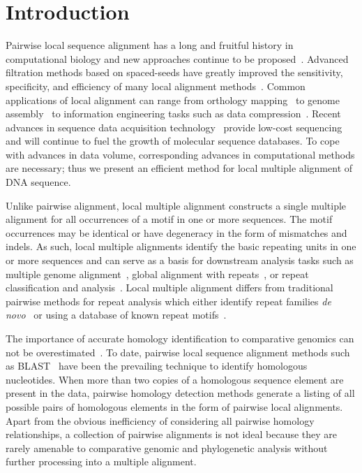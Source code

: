 \documentclass[9.5pt,journal,final,finalsubmission,twocolumn]{IEEEtran}
\begin{document}
\section{Introduction}
Pairwise local sequence alignment has a long and fruitful history
in computational biology and new approaches continue to be
proposed~\cite{ref-pattern,ref-chaos,ref-yass,ref-kahveciMAP}.
Advanced filtration methods based on spaced-seeds have greatly
improved the sensitivity, specificity, and efficiency of many
local alignment
methods~\cite{ref-zhang04,ref-zhang06,ref-buhler05,ref-xu04,ref-batzoglouNAR}.
Common applications of local alignment can range from orthology
mapping~\cite{ref-orthomcl} to genome assembly~\cite{ref-arachne2}
to information engineering tasks such as data
compression~\cite{ref-ane}. Recent advances in sequence data
acquisition technology~\cite{ref-454} provide low-cost sequencing
and will continue to fuel the growth of molecular sequence
databases. To cope with advances in data volume, corresponding
advances in computational methods are necessary; thus we present
an efficient method for local multiple alignment of DNA sequence.

Unlike pairwise alignment, local multiple alignment constructs a
single multiple alignment for all occurrences of a motif in one or
more sequences.  The motif occurrences may be identical or have
degeneracy in the form of mismatches and indels.  As such, local
multiple alignments identify the basic repeating units in one or
more sequences and can serve as a basis for downstream analysis
tasks such as multiple genome
alignment~\cite{ref-mauve,ref-mga,ref-mgcat,ref-deweyReview}, global
alignment with repeats~\cite{ref-otherSammethPaper,ref-aba}, or
repeat classification and analysis~\cite{ref-piler}.  Local multiple
alignment differs from traditional pairwise methods for repeat
analysis which either identify repeat families \textit{de
novo}~\cite{ref-reputer} or using a database of known repeat
motifs~\cite{ref-repbase}.

The importance of accurate homology identification to comparative
genomics can not be overestimated~\cite{Kumar07}. To date, pairwise
local sequence alignment
methods such as BLAST~\cite{ref-blastz,ref-ssearch} have been the
prevailing technique to identify homologous nucleotides.  When more
than two copies of a homologous sequence element are present in the
data, pairwise homology detection methods generate a listing of all
possible pairs of homologous elements in the form of pairwise local
alignments.  Apart from the obvious inefficiency of considering all
pairwise homology relationships, a collection of pairwise alignments
is not ideal because they are rarely amenable to comparative genomic
and phylogenetic analysis without further processing into a multiple
alignment.
\end{document}
